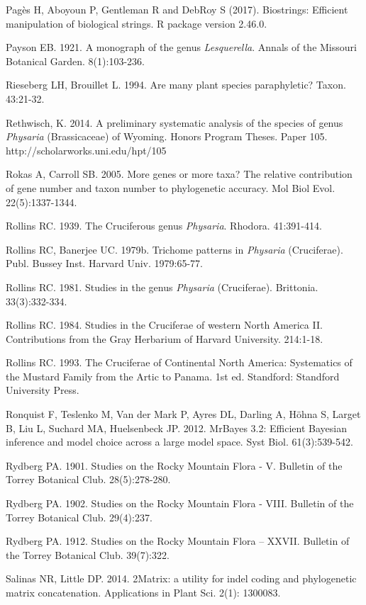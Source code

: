 Pagès H, Aboyoun P, Gentleman R and DebRoy S (2017). Biostrings: Efficient manipulation of biological strings. R package version 2.46.0. 

Payson EB. 1921. A monograph of the genus \textit{Lesquerella}. Annals of the Missouri Botanical Garden. 8(1):103-236.

Rieseberg LH, Brouillet L. 1994. Are many plant species paraphyletic? Taxon. 43:21-32.

Rethwisch, K. 2014. A preliminary systematic analysis of the species of genus \textit{Physaria} (Brassicaceae) of Wyoming. Honors Program Theses. Paper 105.
http://scholarworks.uni.edu/hpt/105

Rokas A, Carroll SB. 2005. More genes or more taxa? The relative contribution of gene number and taxon number to phylogenetic accuracy. Mol Biol Evol. 22(5):1337-1344.

Rollins RC. 1939. The Cruciferous genus \textit{Physaria}. Rhodora. 41:391-414.

Rollins RC, Banerjee UC. 1979b. Trichome patterns in \textit{Physaria} (Cruciferae). Publ. Bussey Inst. Harvard Univ. 1979:65-77.

Rollins RC. 1981. Studies in the genus \textit{Physaria} (Cruciferae). Brittonia. 33(3):332-334.

Rollins RC. 1984. Studies in the Cruciferae of western North America II. Contributions from the Gray Herbarium of Harvard University. 214:1-18.

Rollins RC. 1993. The Cruciferae of Continental North America: Systematics of the Mustard Family from the Artic to Panama. 1st ed. Standford: Standford University Press.

Ronquist F, Teslenko M, Van der Mark P, Ayres DL, Darling A, Höhna S, Larget B, Liu L, Suchard MA, Huelsenbeck JP. 2012. MrBayes 3.2: Efficient Bayesian inference and model choice across a large model space. Syst Biol. 61(3):539-542.

Rydberg PA. 1901. Studies on the Rocky Mountain Flora - V. Bulletin of the Torrey Botanical Club. 28(5):278-280.

Rydberg PA. 1902. Studies on the Rocky Mountain Flora - VIII. Bulletin of the Torrey Botanical Club. 29(4):237.

Rydberg PA. 1912. Studies on the Rocky Mountain Flora – XXVII. Bulletin of the Torrey Botanical Club. 39(7):322.

Salinas NR, Little DP. 2014. 2Matrix: a utility for indel coding and phylogenetic matrix concatenation. Applications in Plant Sci. 2(1): 1300083.

